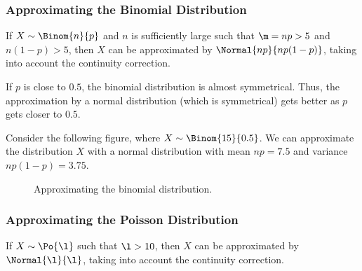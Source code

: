 \subsubsection{Approximating the Binomial Distribution}

\begin{proposition}
    If $X \sim \Binom{n}{p}$ and $n$ is sufficiently large such that $\m = np > 5$ and $n(1-p) > 5$, then $X$ can be approximated by $\Normal{np}{np(1-p)}$, taking into account the continuity correction.
\end{proposition}

If $p$ is close to $0.5$, the binomial distribution is almost symmetrical. Thus, the approximation by a normal distribution (which is symmetrical) gets better as $p$ gets closer to $0.5$.

Consider the following figure, where $X \sim \Binom{15}{0.5}$. We can approximate the distribution $X$ with a normal distribution with mean $np = 7.5$ and variance $np(1-p) = 3.75$.

\begin{figure}[H]
\centering
{}
\caption{Approximating the binomial distribution.}
\end{figure}

\subsubsection{Approximating the Poisson Distribution}

\begin{proposition}
    If $X \sim \Po{\l}$ such that $\l > 10$, then $X$ can be approximated by $\Normal{\l}{\l}$, taking into account the continuity correction.
\end{proposition}

